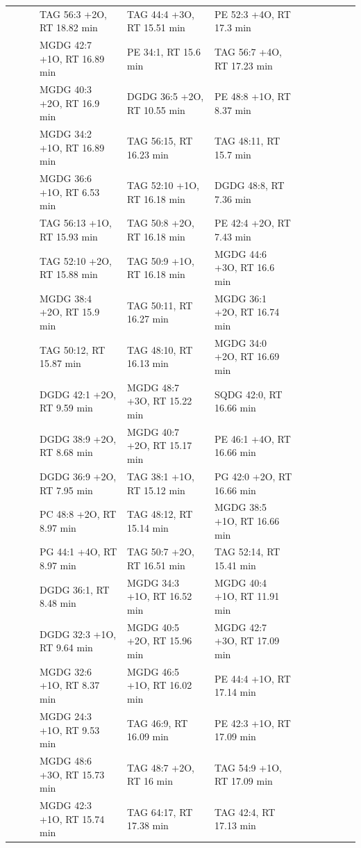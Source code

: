 \begin{landscape}
\begin{footnotesize}
\begin{singlespace}
\begin{flushleft}
\begin{longtable}{ Lp{.03\linewidth} Lp{.12\linewidth} Lp{.03\linewidth} Lp{.24\linewidth} Lp{.24\linewidth} Lp{.24\linewidth} }
 &  &  & TAG 56:3 +2O, RT 18.82 min & TAG 44:4 +3O, RT 15.51 min & PE 52:3 +4O, RT 17.3 min \\
 &  &  & MGDG 42:7 +1O, RT 16.89 min & PE 34:1, RT 15.6 min & TAG 56:7 +4O, RT 17.23 min \\
 &  &  & MGDG 40:3 +2O, RT 16.9 min & DGDG 36:5 +2O, RT 10.55 min & PE 48:8 +1O, RT 8.37 min \\
 &  &  & MGDG 34:2 +1O, RT 16.89 min & TAG 56:15, RT 16.23 min & TAG 48:11, RT 15.7 min \\
 &  &  & MGDG 36:6 +1O, RT 6.53 min & TAG 52:10 +1O, RT 16.18 min & DGDG 48:8, RT 7.36 min \\
 &  &  & TAG 56:13 +1O, RT 15.93 min & TAG 50:8 +2O, RT 16.18 min & PE 42:4 +2O, RT 7.43 min \\
 &  &  & TAG 52:10 +2O, RT 15.88 min & TAG 50:9 +1O, RT 16.18 min & MGDG 44:6 +3O, RT 16.6 min \\
 &  &  & MGDG 38:4 +2O, RT 15.9 min & TAG 50:11, RT 16.27 min & MGDG 36:1 +2O, RT 16.74 min \\
 &  &  & TAG 50:12, RT 15.87 min & TAG 48:10, RT 16.13 min & MGDG 34:0 +2O, RT 16.69 min \\
 &  &  & DGDG 42:1 +2O, RT 9.59 min & MGDG 48:7 +3O, RT 15.22 min & SQDG 42:0, RT 16.66 min \\
 &  &  & DGDG 38:9 +2O, RT 8.68 min & MGDG 40:7 +2O, RT 15.17 min & PE 46:1 +4O, RT 16.66 min \\
 &  &  & DGDG 36:9 +2O, RT 7.95 min & TAG 38:1 +1O, RT 15.12 min & PG 42:0 +2O, RT 16.66 min \\
 &  &  & PC 48:8 +2O, RT 8.97 min & TAG 48:12, RT 15.14 min & MGDG 38:5 +1O, RT 16.66 min \\
 &  &  & PG 44:1 +4O, RT 8.97 min & TAG 50:7 +2O, RT 16.51 min & TAG 52:14, RT 15.41 min \\
 &  &  & DGDG 36:1, RT 8.48 min & MGDG 34:3 +1O, RT 16.52 min & MGDG 40:4 +1O, RT 11.91 min \\
 &  &  & DGDG 32:3 +1O, RT 9.64 min & MGDG 40:5 +2O, RT 15.96 min & MGDG 42:7 +3O, RT 17.09 min \\
 &  &  & MGDG 32:6 +1O, RT 8.37 min & MGDG 46:5 +1O, RT 16.02 min & PE 44:4 +1O, RT 17.14 min \\
 &  &  & MGDG 24:3 +1O, RT 9.53 min & TAG 46:9, RT 16.09 min & PE 42:3 +1O, RT 17.09 min \\
 &  &  & MGDG 48:6 +3O, RT 15.73 min & TAG 48:7 +2O, RT 16 min & TAG 54:9 +1O, RT 17.09 min \\
 &  &  & MGDG 42:3 +1O, RT 15.74 min & TAG 64:17, RT 17.38 min & TAG 42:4, RT 17.13 min \\

\end{longtable}
\end{flushleft}
\end{singlespace}
\end{footnotesize}
\end{landscape}
